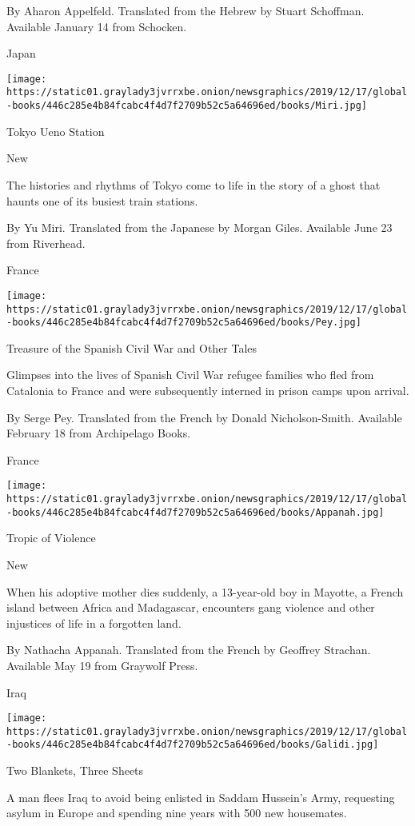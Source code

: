  By Aharon Appelfeld. Translated from the Hebrew by Stuart Schoffman.
Available January 14 from Schocken.

Japan

\texttt{[image: https://static01.graylady3jvrrxbe.onion/newsgraphics/2019/12/17/global-books/446c285e4b84fcabc4f4d7f2709b52c5a64696ed/books/Miri.jpg]}

Tokyo Ueno Station

New

The histories and rhythms of Tokyo come to life in the story of a ghost
that haunts one of its busiest train stations.

 By Yu Miri. Translated from the Japanese by Morgan Giles. Available
June 23 from Riverhead.

France

\texttt{[image: https://static01.graylady3jvrrxbe.onion/newsgraphics/2019/12/17/global-books/446c285e4b84fcabc4f4d7f2709b52c5a64696ed/books/Pey.jpg]}

Treasure of the Spanish Civil War and Other Tales

Glimpses into the lives of Spanish Civil War refugee families who fled
from Catalonia to France and were subsequently interned in prison camps
upon arrival.

 By Serge Pey. Translated from the French by Donald Nicholson-Smith.
Available February 18 from Archipelago Books.

France

\texttt{[image: https://static01.graylady3jvrrxbe.onion/newsgraphics/2019/12/17/global-books/446c285e4b84fcabc4f4d7f2709b52c5a64696ed/books/Appanah.jpg]}

Tropic of Violence

New

When his adoptive mother dies suddenly, a 13-year-old boy in Mayotte, a
French island between Africa and Madagascar, encounters gang violence
and other injustices of life in a forgotten land.

 By Nathacha Appanah. Translated from the French by Geoffrey Strachan.
Available May 19 from Graywolf Press.

Iraq

\texttt{[image: https://static01.graylady3jvrrxbe.onion/newsgraphics/2019/12/17/global-books/446c285e4b84fcabc4f4d7f2709b52c5a64696ed/books/Galidi.jpg]}

Two Blankets, Three Sheets

A man flees Iraq to avoid being enlisted in Saddam Hussein's Army,
requesting asylum in Europe and spending nine years with 500 new
housemates.

